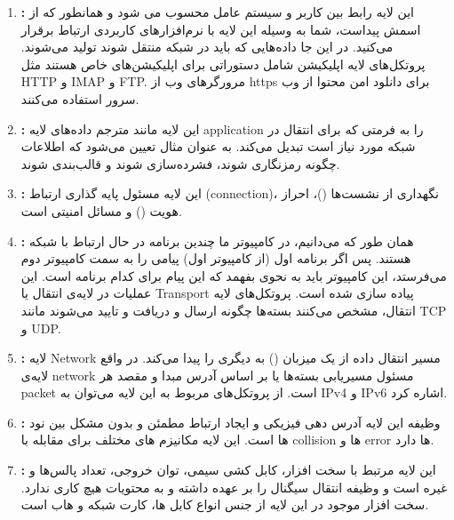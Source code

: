 \documentclass[]{article}
\newcommand{\link}[2]{\href{#1}{\textcolor{blue}{#2}}}
\begin{document}
\begin{enumerate}
	\item \textbf{:} این لایه رابط بین کاربر و سیستم عامل محسوب می شود و همانطور که از اسمش پیداست، شما به وسیله این لایه با نرم‌افزارهای کاربردی ارتباط برقرار می‌کنید. در این جا داده‌هایی که باید در شبکه منتقل شوند تولید می‌شوند. پروتکل‌های لایه اپلیکیشن شامل دستوراتی برای اپلیکیشن‌های خاص هستند مثل HTTP و IMAP و FTP. مرورگرهای وب از https برای دانلود امن محتوا از وب سرور استفاده می‌کنند.
	\item \textbf{:} این لایه مانند مترجم داده‌های لایه application‌ را به فرمتی که برای انتقال در شبکه مورد نیاز است تبدیل می‌کند. به عنوان مثال تعیین می‌شود که اطلاعات چگونه رمزنگاری شوند، فشرده‌سازی شوند و قالب‌بندی شوند. 
	\item \textbf{:} این لایه مسئول پایه گذاری ارتباط (connection)، نگهداری از نشست‌ها (\link{https://www.computerhope.com/jargon/s/session.htm}{\lr{session}})، احراز هویت (\link{https://www.geeksforgeeks.org/authentication-in-computer-network/}{\lr{authentication}}) و مسائل امنیتی است.
	\item \textbf{:} همان طور که می‌دانیم، در کامپیوتر ما چندین برنامه در حال ارتباط با شبکه هستند. پس اگر برنامه اول (از کامپیوتر اول) پیامی را به سمت کامپیوتر دوم می‌فرستد، این کامپیوتر باید به نحوی بفهمد که این پیام برای کدام برنامه است. این عملیات در لایه‌ی انتقال یا Transport پیاده سازی شده است. پروتکل‌های لایه انتقال، مشخص می‌کنند بسته‌ها چگونه ارسال و دریافت و تایید می‌شوند مانند TCP و UDP.
	\item \textbf{:} لایه‌ Network‌ مسیر انتقال داده از یک میزبان (\link{https://www.techtarget.com/searchnetworking/definition/host}{\lr{host}}) به دیگری را پیدا می‌کند. در واقع لایه‌ی network مسئول مسیریابی بسته‌ها یا \link{https://en.wikipedia.org/wiki/Routing}{} بر اساس آدرس مبدا و مقصد هر packet است. از پروتکل‌های مربوط به این لایه می‌توان به  IPv4 و IPv6 اشاره کرد.
	\item \textbf{:} وظیفه این لایه آدرس دهی فیزیکی و ایجاد ارتباط مطمئن و بدون مشکل بین نود ها است. این لایه مکانیزم های مختلف برای مقابله با collision ها و error ها دارد.
	\item \textbf{:} این لایه مرتبط با سخت افزار، کابل کشی سیمی، توان خروجی، تعداد پالس‌ها و غیره است و وظیفه انتقال سیگنال را بر عهده داشته و به محتویات هیچ کاری ندارد. سخت افزار موجود در این لایه از جنس انواع کابل ها، کارت شبکه و هاب است.
\end{enumerate}
\end{document}
